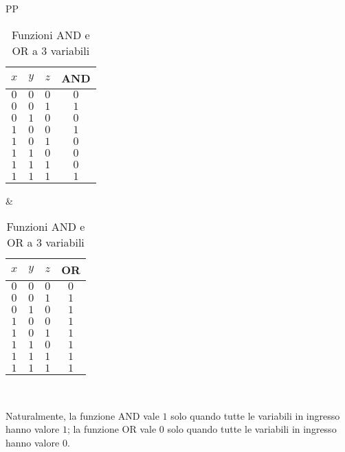 \documentclass[a4paper]{extarticle}
\begin{document}
\noindent
\begin{table}[H]
    \centering
    \noindent
    \begin{tabularx}{\textwidth}{PP}
    {
        \begin{tabular}{c|c|c|c}
             \(x\) & \(y\) & \(z\) & AND\\
             \hline
             $0$ & $0$ & $0$ & $0$\\
             $0$ & $0$ & $1$ & $1$\\
             $0$ & $1$ & $0$ & $0$\\
             $1$ & $0$ & $0$ & $1$\\
             $1$ & $0$ & $1$ & $0$\\
             $1$ & $1$ & $0$ & $0$\\
             $1$ & $1$ & $1$ & $0$\\
             $1$ & $1$ & $1$ & $1$
        \end{tabular}
    }
    &
    {
        \begin{tabular}{c|c|c|c}
             \(x\) & \(y\) & \(z\) & OR\\
             \hline
             $0$ & $0$ & $0$ & $0$\\
             $0$ & $0$ & $1$ & $1$\\
             $0$ & $1$ & $0$ & $1$\\
             $1$ & $0$ & $0$ & $1$\\
             $1$ & $0$ & $1$ & $1$\\
             $1$ & $1$ & $0$ & $1$\\
             $1$ & $1$ & $1$ & $1$\\
             $1$ & $1$ & $1$ & $1$
        \end{tabular}
    }\\
    \end{tabularx}
    \caption{Funzioni AND e OR  a $3$ variabili}
    \label{tab:AND_OR_3_variabili}
\end{table}

\noindent
Naturalmente, la funzione AND vale \(1\) solo quando tutte le variabili in ingresso hanno valore \(1\); la funzione OR vale \(0\) solo quando tutte le variabili in ingresso hanno valore \(0\).
\end{document}
